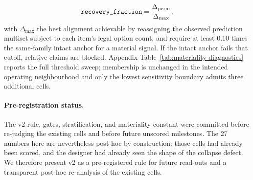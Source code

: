 \begin{equation}
\text{\texttt{recovery\_fraction}}=\frac{\Delta_{\mathrm{perm}}}{\Delta_{\max}},
\end{equation}
with $\Delta_{\max}$ the best alignment achievable by reassigning the observed prediction multiset subject to each item's legal option count, and require at least 0.10 times the same-family intact anchor for a material signal. If the intact anchor fails that cutoff, relative claims are blocked. Appendix Table~\ref{tab:materiality-diagnostics} reports the full threshold sweep; membership is unchanged in the intended operating neighbourhood and only the lowest sensitivity boundary admits three additional cells.

\paragraph{Pre-registration status.}
The v2 rule, gates, stratification, and materiality constant were committed before re-judging the existing cells and before future unscored milestones. The 27 numbers here are nevertheless post-hoc by construction: those cells had already been scored, and the designer had already seen the shape of the collapse defect. We therefore present v2 as a pre-registered rule for future read-outs and a transparent post-hoc re-analysis of the existing cells.
